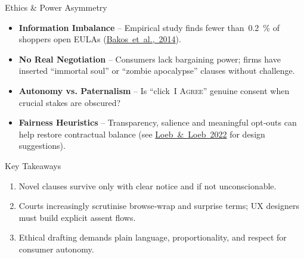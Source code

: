 \begin{frame}{Ethics \& Power Asymmetry}
  \begin{itemize}
    \item \textbf{Information Imbalance} – Empirical study finds fewer than 0.2 \% of shoppers open EULAs (\href{https://papers.ssrn.com/sol3/papers.cfm?abstract_id=160308}{Bakos et al., 2014}).
    \item \textbf{No Real Negotiation} – Consumers lack bargaining power; firms have inserted “immortal soul” or “zombie apocalypse” clauses without challenge.
    \item \textbf{Autonomy vs. Paternalism} – Is “click \textsc{I Agree}” genuine consent when crucial stakes are obscured?
    \item \textbf{Fairness Heuristics} – Transparency, salience and meaningful opt‑outs can help restore contractual balance (see \href{https://www.loeb.com/en/insights/publications/2022/01/tldr-act}{Loeb \& Loeb 2022} for design suggestions).
  \end{itemize}
\end{frame}

\begin{frame}{Key Takeaways}
  \begin{enumerate}
    \item Novel clauses survive only with clear notice and if not unconscionable.
    \item Courts increasingly scrutinise browse‑wrap and surprise terms; UX designers must build explicit assent flows.
    \item Ethical drafting demands plain language, proportionality, and respect for consumer autonomy.
  \end{enumerate}
\end{frame}
